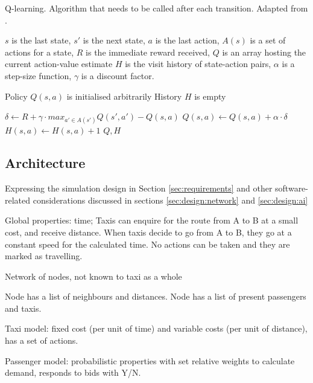 \begin{algorithm}
  \caption{
  Q-learning. Algorithm that needs to be called after each transition. 
  Adapted from \textcite{Sutton1998ai+reinforcement}. 
  \label{algorithm:q}}

  \begin{algorithmic}[1]
    \Require 
      \Statex $s$ is the last state,
      \Statex $s'$ is the next state,
      \Statex $a$ is the last action,
      \Statex $A(s)$ is a set of actions for a state,
      \Statex $R$ is the immediate reward received,
      \Statex $Q$ is an array hosting the current action-value estimate
      \Statex $H$ is the visit history of state-action pairs,
      \Statex $\alpha$ is a step-size function,
      \Statex $\gamma$ is a discount factor.

      \Statex Policy $Q(s, a)$ is initialised arbitrarily
      \Statex History $H$ is empty

      \State $\delta \gets R + 
              \gamma \cdot max_{a' \in A(s')} Q(s', a') - Q(s, a)$
      \State $Q(s, a) \gets Q(s, a) + \alpha \cdot \delta$
      \State $H(s, a) \gets H(s, a) + 1$
      \Return $Q, H$      
    \EndFunction
  \end{algorithmic}

\end{algorithm}

\subsection{Architecture} 
\label{sec:design:architecture}

Expressing the simulation design in Section \ref{sec:requirements} and
other software-related considerations discussed in sections
\ref{sec:design:network} and \ref{sec:design:ai}

Global properties: time; Taxis
can enquire for the route from A to B at a small cost, and receive distance.
When taxis decide to go from A to B, they go at a constant speed for the
calculated time. No actions can be taken and they are marked as travelling.

Network of nodes, not known to taxi as a whole

Node has a list of neighbours and distances.
Node has a list of present passengers and taxis.

Taxi model: fixed cost (per unit of time) and variable costs (per unit of
distance), has a set of actions.

Passenger model: probabilistic properties with set relative weights to
calculate demand, responds to bids with Y/N.

